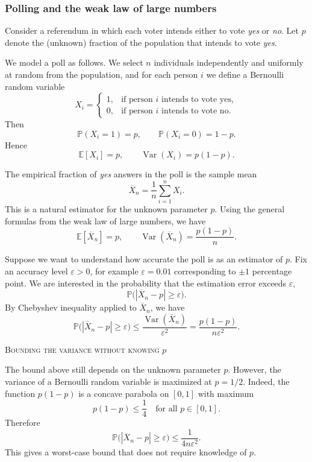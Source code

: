\subsubsection{Polling and the weak law of large numbers}

Consider a referendum in which each voter intends either to vote \textit{yes} or \textit{no}.  
Let \(p\) denote the (unknown) fraction of the population that intends to vote \textit{yes}.  

We model a poll as follows.  
We select \(n\) individuals independently and uniformly at random from the population, and for each person \(i\) we define a Bernoulli random variable
\[
X_i
=
\begin{cases}
1, & \text{if person } i \text{ intends to vote yes},\\
0, & \text{if person } i \text{ intends to vote no}.
\end{cases}
\]
Then
\[
\mathbb{P}(X_i = 1) = p,
\qquad
\mathbb{P}(X_i = 0) = 1 - p.
\]
Hence
\[
\mathbb{E}[X_i] = p,
\qquad
\operatorname{Var}(X_i) = p(1-p).
\]

The empirical fraction of \textit{yes} answers in the poll is the sample mean
\[
\overline{X}_n
=
\frac{1}{n} \sum_{i=1}^{n} X_i.
\]
This is a natural estimator for the unknown parameter \(p\).  
Using the general formulas from the weak law of large numbers, we have
\[
\mathbb{E}[\overline{X}_n] = p,
\qquad
\operatorname{Var}(\overline{X}_n) = \frac{p(1-p)}{n}.
\]

Suppose we want to understand how accurate the poll is as an estimator of \(p\).  
Fix an accuracy level \(\varepsilon > 0\), for example \(\varepsilon = 0.01\) corresponding to \(\pm 1\) percentage point.  
We are interested in the probability that the estimation error exceeds \(\varepsilon\),
\[
\mathbb{P}\big(|\overline{X}_n - p| \ge \varepsilon\big).
\]
By Chebyshev inequality applied to \(\overline{X}_n\), we have
\[
\mathbb{P}\big(|\overline{X}_n - p| \ge \varepsilon\big)
\le
\frac{\operatorname{Var}(\overline{X}_n)}{\varepsilon^{2}}
=
\frac{p(1-p)}{n \varepsilon^{2}}.
\]

\bigskip
\textsc{Bounding the variance without knowing \(p\)}

The bound above still depends on the unknown parameter \(p\).  
However, the variance of a Bernoulli random variable is maximized at \(p = 1/2\).  
Indeed, the function \(p(1-p)\) is a concave parabola on \([0,1]\) with maximum
\[
p(1-p) \le \frac{1}{4}
\quad
\text{for all } p \in [0,1].
\]
Therefore
\[
\mathbb{P}\big(|\overline{X}_n - p| \ge \varepsilon\big)
\le
\frac{1}{4 n \varepsilon^{2}}.
\]
This gives a worst-case bound that does not require knowledge of \(p\).  

